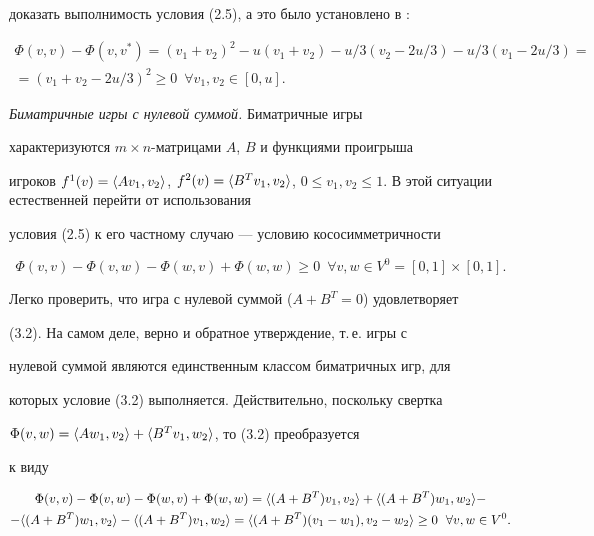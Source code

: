 доказать выполнимость условия (2.5), а это было установлено в \cite{6}: 


\begin{multline*} 


\Phi(v,v)-\Phi(v,v^*)=(v_1+v_2)^2-u(v_1+v_2)-u/3(v_2-2u/3)- 


u/3(v_1-2u/3)= \\


=(v_1+v_2-2u/3)^2\ge 0\ \; \forall v_1,v_2\in[0,u]. 


\end{multline*}  


 


{\it Биматричные игры с нулевой суммой.} Биматричные игры 


характеризуются $m\times n$-матрицами $A$, $B$ и функциями проигрыша 


игроков $f^1(v)=\la A v_1,v_2\ra$, $f^2(v)=\la B^T v_1,v_2\ra$, $0\le 


v_1,v_2\le 1$. В этой ситуации естественней перейти от использования 


условия (2.5) к его частному случаю --- условию кососимметричности 


\begin{equation} 


\Phi(v,v)-\Phi(v,w)-\Phi(w,v)+\Phi(w,w)\ge0 


\ \; \forall v,w\in V^0=[0,1]\times[0,1]. 


\end{equation} 


Легко проверить, что игра с нулевой суммой ($A+B^T=0$) удовлетворяет 


(3.2). На самом деле, верно и обратное утверждение, т.\,е. игры с 


нулевой суммой являются единственным классом биматричных игр, для 


которых условие (3.2) выполняется. Действительно, поскольку свертка 


$\Phi(v,w)=\langle A w_1,v_2\rangle+\langle B^T v_1,w_2\rangle$, то (3.2) преобразуется 


к виду 


\begin{multline*} 


\Phi(v,v)-\Phi(v,w)-\Phi(w,v)+\Phi(w,w)= 


\la(A+B^T)v_1,v_2\ra +\la(A+B^T)w_1,w_2\ra - \\ 


% 


-\la(A+B^T)w_1,v_2\ra-\la (A+B^T)v_1,w_2\ra= 


\la(A+B^T)(v_1-w_1),v_2-w_2\ra\ge 0\ \; \forall v,w\in V^0. 


\end{multline*} 


